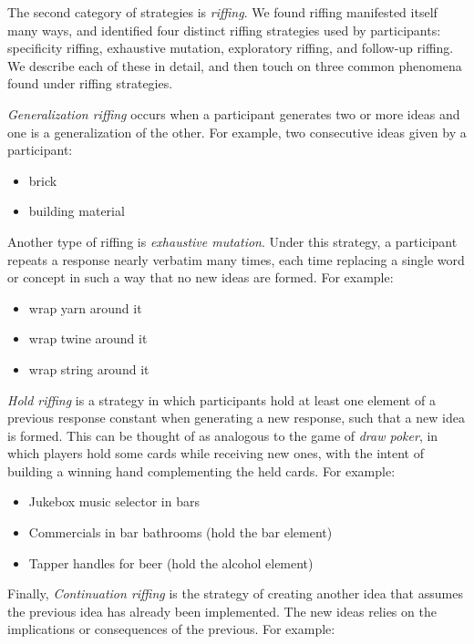 The second category of strategies is \emph{riffing}.
We found riffing manifested itself many ways, and identified four distinct riffing strategies used by participants: specificity riffing, exhaustive mutation, exploratory riffing, and follow-up riffing. We describe each of these in detail, and then touch on three common phenomena found under riffing strategies.

\emph{Generalization riffing} occurs when a participant generates two or more ideas and one is a generalization of the other. For example, two consecutive ideas given by a participant:

\begin{itemize}
    \item brick
    \item building material
\end{itemize}

Another type of riffing is \emph{exhaustive mutation}. Under this strategy, a participant repeats a response nearly verbatim many times, each time replacing a single word or concept in such a way that no new ideas are formed. For example:

\begin{itemize}
    \item wrap yarn around it
    \item wrap twine around it
    \item wrap string around it
\end{itemize}

\emph{Hold riffing} is a strategy in which participants hold at least one element of a previous response constant when generating a new response, such that a new idea is formed. This can be thought of as analogous to the game of \emph{draw poker}, in which players hold some cards while receiving new ones, with the intent of building a winning hand complementing the held cards.
For example:

\begin{itemize}
    \item Jukebox music selector in bars
    \item Commercials in bar bathrooms (hold the bar element)
    \item Tapper handles for beer (hold the alcohol element)
\end{itemize}

Finally, \emph{Continuation riffing} is the strategy of creating another idea that assumes the previous idea has already been implemented. The new ideas relies on the implications or consequences of the previous. For example:

